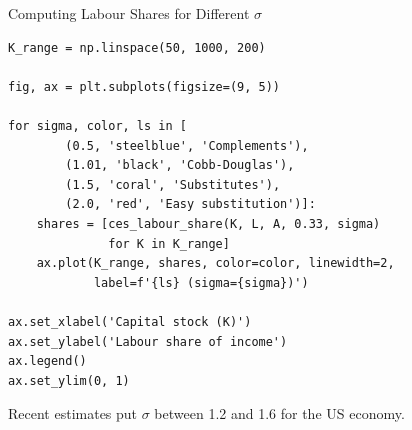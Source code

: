\documentclass[aspectratio=169, 10pt]{beamer}
\begin{document}
\begin{frame}[fragile]{Computing Labour Shares for Different $\sigma$}
\begin{lstlisting}
K_range = np.linspace(50, 1000, 200)

fig, ax = plt.subplots(figsize=(9, 5))

for sigma, color, ls in [
        (0.5, 'steelblue', 'Complements'),
        (1.01, 'black', 'Cobb-Douglas'),
        (1.5, 'coral', 'Substitutes'),
        (2.0, 'red', 'Easy substitution')]:
    shares = [ces_labour_share(K, L, A, 0.33, sigma)
              for K in K_range]
    ax.plot(K_range, shares, color=color, linewidth=2,
            label=f'{ls} (sigma={sigma})')

ax.set_xlabel('Capital stock (K)')
ax.set_ylabel('Labour share of income')
ax.legend()
ax.set_ylim(0, 1)
\end{lstlisting}
\vspace{0.3em}
Recent estimates put $\sigma$ between 1.2 and 1.6 for the US economy.
\end{frame}
\end{document}
